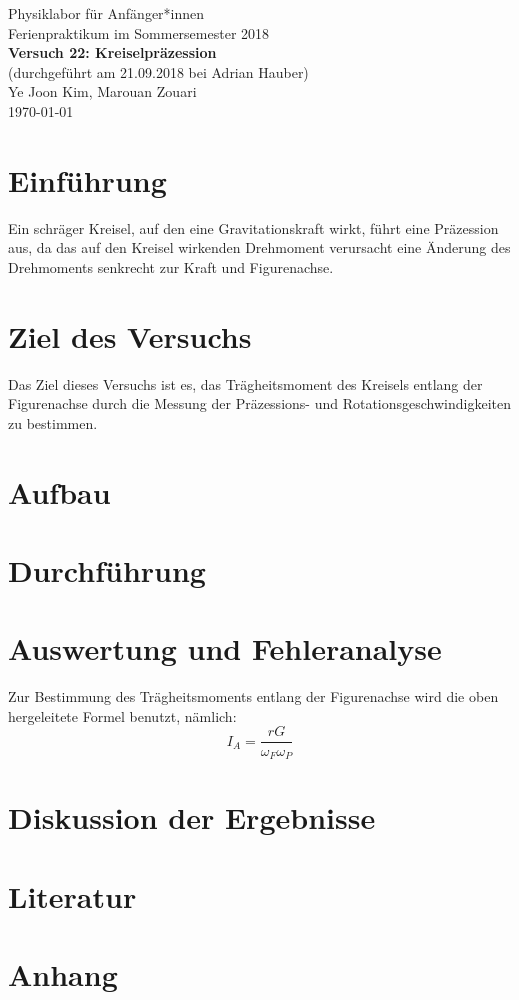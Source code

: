 \documentclass[11pt,a4paper]{article} %
\begin{document}
{
	\centering 
	\large 
	Physiklabor für Anfänger*innen \\
	Ferienpraktikum im Sommersemester 2018 \\[4mm]
	\textbf{\LARGE 
		Versuch 22: Kreiselpräzession
	} \\[3mm]
	(durchgeführt am 21.09.2018 bei Adrian Hauber) \\
	Ye Joon Kim, Marouan Zouari\\
	\today \\[10mm]
}

\section{Einführung}
Ein schräger Kreisel, auf den eine Gravitationskraft wirkt, führt eine Präzession aus, da das auf den Kreisel wirkenden Drehmoment verursacht eine Änderung des Drehmoments senkrecht zur Kraft und Figurenachse. 


\section{Ziel des Versuchs}
Das Ziel dieses Versuchs ist es, das Trägheitsmoment des Kreisels entlang der Figurenachse durch die Messung der Präzessions- und Rotationsgeschwindigkeiten zu bestimmen.

\section{Aufbau}

\section{Durchführung}

\section{Auswertung und Fehleranalyse}
Zur Bestimmung des Trägheitsmoments entlang der Figurenachse wird die oben hergeleitete Formel benutzt, nämlich:
$$I_A = \frac{rG}{\omega_F \omega_P}$$


\section{Diskussion der Ergebnisse}

\section{Literatur}

\section{Anhang}
\end{document}
